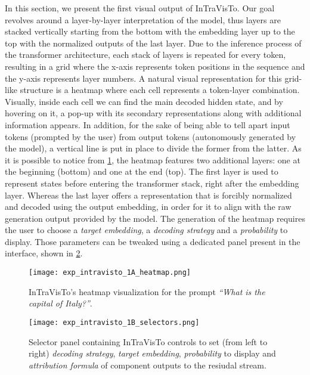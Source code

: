 In this section, we present the first visual output of InTraVisTo.
Our goal revolves around a layer-by-layer interpretation of the model, thus layers are stacked vertically starting from the bottom with the embedding layer up to the top with the normalized outputs of the last layer.
Due to the inference process of the transformer architecture, each stack of layers is repeated for every token, resulting in a grid where the x-axis represents token positions in the sequence and the y-axis represents layer numbers.
A natural visual representation for this grid-like structure is a heatmap where each cell represents a token-layer combination.
Visually, inside each cell we can find the main decoded hidden state, and by hovering on it, a pop-up with its secondary representations along with additional information appears.
In addition, for the sake of being able to tell apart input tokens (prompted by the user) from output tokens (autonomously generated by the model), a vertical line is put in place to divide the former from the latter.
As it is possible to notice from \cref{fig:exp_intravisto_1_A}, the heatmap features two additional layers: one at the beginning (bottom) and one at the end (top).
The first layer is used to represent states before entering the transformer stack, right after the embedding layer.
Whereas the last layer offers a representation that is forcibly normalized and decoded using the output embedding, in order for it to align with the raw generation output provided by the model.
The generation of the heatmap requires the user to choose a \emph{target embedding}, a \emph{decoding strategy} and a \emph{probability} to display.
Those parameters can be tweaked using a dedicated panel present in the interface, shown in \cref{fig:exp_intravisto_1_B}.

\begin{figure}[t!]
    \centering
    \texttt{[image: exp\_intravisto\_1A\_heatmap.png]}
    \caption{InTraVisTo's heatmap visualization for the prompt \emph{``What is the capital of Italy?''}.}
    \label{fig:exp_intravisto_1_A}
\end{figure}

\begin{figure}[t!]
    \centering
    \texttt{[image: exp\_intravisto\_1B\_selectors.png]}
    \caption{Selector panel containing InTraVisTo controls to set (from left to right) \emph{decoding strategy}, \emph{target embedding}, \emph{probability} to display and \emph{attribution formula} of component outputs to the resiudal stream.}
    \label{fig:exp_intravisto_1_B}
\end{figure}

